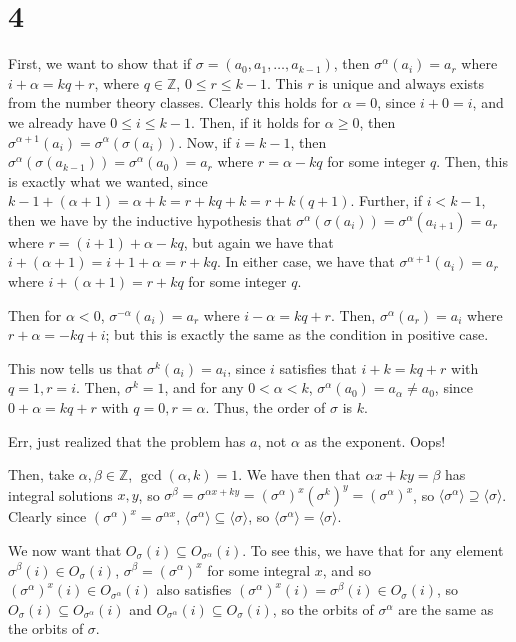 \documentclass[12pt,letterpaper]{article}
\theoremstyle{definition}
\newcommand{\Z}{\mathbb{Z}}
\begin{document}
\section*{4}

First, we want to show that if $\sigma = (a_{0}, a_{1}, \dots, a_{k-1})$, then $\sigma^{\alpha}(a_{i}) = a_{r}$ where $i + \alpha = kq + r$, where $q \in \Z$, $0 \leq r \leq k-1$. This $r$ is unique and always exists from the number theory classes. Clearly this holds for $\alpha = 0$, since $i + 0 = i$, and we already have $0 \leq i \leq k - 1$. Then, if it holds for $\alpha \geq 0$, then $\sigma^{\alpha + 1}(a_{i}) = \sigma^{\alpha}(\sigma(a_{i}))$. Now, if $i = k - 1$, then $\sigma^{\alpha}(\sigma(a_{k-1})) = \sigma^{\alpha}(a_{0}) = a_{r}$ where $r = \alpha - kq$ for some integer $q$. Then, this is exactly what we wanted, since $k-1 + (\alpha + 1) = \alpha + k = r + kq + k = r + k(q + 1)$. Further, if $i < k - 1$, then we have by the inductive hypothesis that $\sigma^{\alpha}(\sigma(a_{i})) = \sigma^{\alpha}(a_{i+1}) = a_{r}$ where $r = (i + 1) + \alpha - kq$, but again we have that $i + (\alpha + 1) = i + 1 + \alpha = r + kq$. In either case, we have that $\sigma^{\alpha + 1}(a_{i}) = a_{r}$ where $i + (\alpha + 1) = r + kq$ for some integer $q$.

Then for $\alpha < 0$, $\sigma^{-\alpha}(a_{i}) = a_{r}$ where $i - \alpha = kq + r$. Then, $\sigma^{\alpha}(a_{r}) = a_{i}$ where $r + \alpha = -kq + i$; but this is exactly the same as the condition in positive case.

This now tells us that $\sigma^{k}(a_{i}) = a_{i}$, since $i$ satisfies that $i + k = kq + r$ with $q = 1, r = i$. Then, $\sigma^{k} = 1$, and for any $0 < \alpha < k$, $\sigma^{\alpha}(a_{0}) = a_{\alpha} \neq a_{0}$, since $0 + \alpha = kq + r$ with $q = 0, r= \alpha$. Thus, the order of $\sigma$ is $k$.

Err, just realized that the problem has $a$, not $\alpha$ as the exponent. Oops!

Then, take $\alpha, \beta \in \Z$, $\gcd(\alpha, k) = 1$. We have then that $\alpha x + k y = \beta$ has integral solutions $x,y$, so $\sigma^{\beta} = \sigma^{\alpha x + ky} = (\sigma^{\alpha})^{x}(\sigma^{k})^{y} = (\sigma^{\alpha})^{x}$, so $\langle \sigma^{\alpha} \rangle \supseteq \langle \sigma \rangle$. Clearly since $(\sigma^{\alpha})^{x} = \sigma^{\alpha x}$, $\langle \sigma^{\alpha} \rangle \subseteq \langle \sigma \rangle$, so $\langle \sigma^{\alpha} \rangle = \langle \sigma \rangle$.

We now want that $O_{\sigma}(i) \subseteq O_{\sigma^{\alpha}}(i)$. To see this, we have that for any element $\sigma^{\beta}(i) \in O_{\sigma}(i)$, $\sigma^{\beta} = (\sigma^{\alpha})^{x}$ for some integral $x$, and so $(\sigma^{\alpha})^{x}(i) \in O_{\sigma^{\alpha}}(i)$ also satisfies $(\sigma^{\alpha})^{x}(i) = \sigma^{\beta}(i) \in O_{\sigma}(i)$, so $O_{\sigma}(i) \subseteq O_{\sigma^{\alpha}}(i)$ and $O_{\sigma^{\alpha}}(i) \subseteq O_{\sigma}(i)$, so the orbits of $\sigma^{\alpha}$ are the same as the orbits of $\sigma$.
\end{document}

